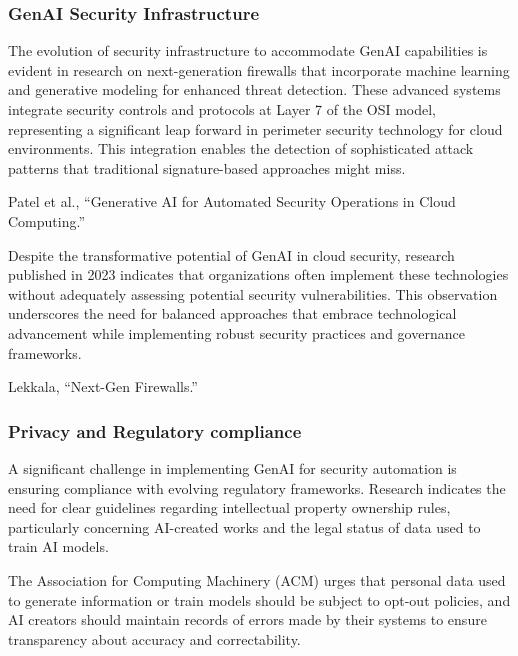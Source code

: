 
\subsubsection{GenAI Security Infrastructure} %
\label{sec:GenAI Security Infrastructure}

The evolution of security infrastructure to accommodate GenAI capabilities is evident in research on next-generation firewalls that incorporate machine learning and generative modeling for enhanced threat detection. These advanced systems integrate security controls and protocols at Layer 7 of the OSI model, representing a significant leap forward in perimeter security technology for cloud environments. This integration enables the detection of sophisticated attack patterns that traditional signature-based approaches might miss.

Patel et al., “Generative AI for Automated Security Operations in Cloud Computing.”

Despite the transformative potential of GenAI in cloud security, research published in 2023 indicates that organizations often implement these technologies without adequately assessing potential security vulnerabilities. This observation underscores the need for balanced approaches that embrace technological advancement while implementing robust security practices and governance frameworks.

Lekkala, “Next-Gen Firewalls.”


\subsubsection{Privacy and Regulatory compliance} %
\label{sec:Privacy and Regulatory compliance}

A significant challenge in implementing GenAI for security automation is ensuring compliance with evolving regulatory frameworks. Research indicates the need for clear guidelines regarding intellectual property ownership rules, particularly concerning AI-created works and the legal status of data used to train AI models.

The Association for Computing Machinery (ACM) urges that personal data used to generate information or train models should be subject to opt-out policies, and AI creators should maintain records of errors made by their systems to ensure transparency about accuracy and correctability.

